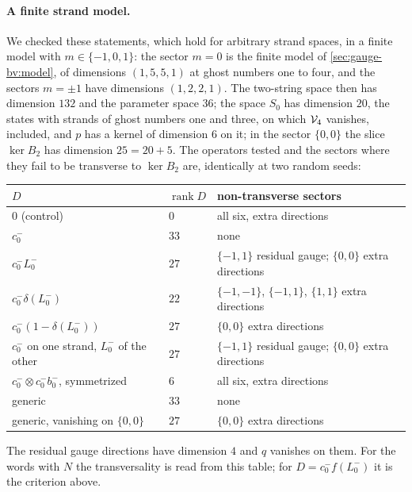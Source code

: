 \paragraph{A finite strand model.}
We checked these statements, which hold for arbitrary strand spaces, in a finite model with $m \in \{ -1, 0, 1 \}$: the sector $m = 0$ is the finite model of \cref{sec:gauge-bv:model}, of dimensions $(1, 5, 5, 1)$ at ghost numbers one to four, and the sectors $m = \pm 1$ have dimensions $(1, 2, 2, 1)$.
The two-string space then has dimension $132$ and the parameter space $36$; the space $S_0$ has dimension $20$, the states with strands of ghost numbers one and three, on which $\mathcal{V}_{4}$ vanishes, included, and $p$ has a kernel of dimension $6$ on it; in the sector $\{ 0, 0 \}$ the slice $\ker B_2$ has dimension $25 = 20 + 5$.
The operators tested and the sectors where they fail to be transverse to $\ker B_2$ are, identically at two random seeds:
\begin{center}
  \small
  \begin{tabular}{lll}
    \toprule
    $D$ & $\operatorname{rank} D$ & non-transverse sectors \\
    \midrule
    $0$ (control) & $0$ & all six, extra directions \\
    $c_0^-$ & $33$ & none \\
    $c_0^- L_0^-$ & $27$ & $\{ -1, 1 \}$ residual gauge; $\{ 0, 0 \}$ extra directions \\
    $c_0^- \delta(L_0^-)$ & $22$ & $\{ -1, -1 \}$, $\{ -1, 1 \}$, $\{ 1, 1 \}$ extra directions \\
    $c_0^- (1 - \delta(L_0^-))$ & $27$ & $\{ 0, 0 \}$ extra directions \\
    $c_0^-$ on one strand, $L_0^-$ of the other & $27$ & $\{ -1, 1 \}$ residual gauge; $\{ 0, 0 \}$ extra directions \\
    $c_0^- \otimes c_0^- b_0^-$, symmetrized & $6$ & all six, extra directions \\
    generic & $33$ & none \\
    generic, vanishing on $\{ 0, 0 \}$ & $27$ & $\{ 0, 0 \}$ extra directions \\
    \bottomrule
  \end{tabular}
\end{center}
The residual gauge directions have dimension $4$ and $q$ vanishes on them.
For the words with $N$ the transversality is read from this table; for $D = c_0^- f(L_0^-)$ it is the criterion above.

